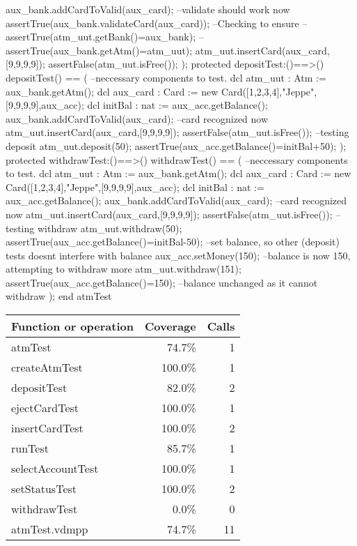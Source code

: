 \documentclass[a4paper]{article}
\begin{document}
\begin{vdm_al}
        aux_bank.addCardToValid(aux_card); --validate should work now
        assertTrue(aux_bank.validateCard(aux_card)); --Checking to ensure
        --assertTrue(atm_uut.getBank()=aux_bank);
        --assertTrue(aux_bank.getAtm()=atm_uut);
        atm_uut.insertCard(aux_card,[9,9,9,9]);
        assertFalse(atm_uut.isFree()); 
    );
    protected depositTest:()==>()
    depositTest() == (
        --neccessary components to test.
        dcl atm_uut : Atm := aux_bank.getAtm();
        dcl aux_card : Card := new Card([1,2,3,4],"Jeppe",[9,9,9,9],aux_acc);
        dcl initBal : nat := aux_acc.getBalance();
        aux_bank.addCardToValid(aux_card); --card recognized now
        atm_uut.insertCard(aux_card,[9,9,9,9]);
        assertFalse(atm_uut.isFree());
        --testing deposit
        atm_uut.deposit(50);
        assertTrue(aux_acc.getBalance()=initBal+50);
    );
    protected withdrawTest:()==>()
    withdrawTest() == (
        --neccessary components to test.
        dcl atm_uut : Atm := aux_bank.getAtm();
        dcl aux_card : Card := new Card([1,2,3,4],"Jeppe",[9,9,9,9],aux_acc);
        dcl initBal : nat := aux_acc.getBalance();
        aux_bank.addCardToValid(aux_card); --card recognized now
        atm_uut.insertCard(aux_card,[9,9,9,9]);
        assertFalse(atm_uut.isFree());
        --testing withdraw
        atm_uut.withdraw(50);
        assertTrue(aux_acc.getBalance()=initBal-50);
        --set balance, so other (deposit) tests doesnt interfere with balance
        aux_acc.setMoney(150);
        --balance is now 150, attempting to withdraw more
        atm_uut.withdraw(151);
        assertTrue(aux_acc.getBalance()=150); --balance unchanged as it cannot withdraw
    );
end atmTest
\end{vdm_al}
\bigskip
\begin{longtable}{|l|r|r|}
\hline
Function or operation & Coverage & Calls \\
\hline
\hline
atmTest & 74.7\% & 1 \\
\hline
createAtmTest & 100.0\% & 1 \\
\hline
depositTest & 82.0\% & 2 \\
\hline
ejectCardTest & 100.0\% & 1 \\
\hline
insertCardTest & 100.0\% & 2 \\
\hline
runTest & 85.7\% & 1 \\
\hline
selectAccountTest & 100.0\% & 1 \\
\hline
setStatusTest & 100.0\% & 2 \\
\hline
withdrawTest & 0.0\% & 0 \\
\hline
\hline
atmTest.vdmpp & 74.7\% & 11 \\
\hline
\end{longtable}
\end{document}
